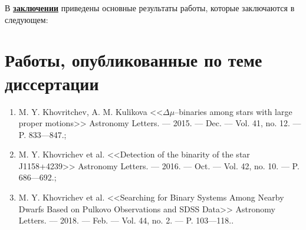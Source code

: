 В \underline{\textbf{заключении}} приведены основные результаты работы, которые заключаются в следующем:




\section*{Работы, опубликованные по теме диссертации}

\begin{enumerate}
 \item M. Y. Khovritchev, A. M. Kulikova <<$\Delta\mu$–binaries among stars with large proper motions>> Astronomy Letters. –– 2015. –– Dec. –– Vol. 41, no. 12. –– P. 833––847.;
 \item M. Y. Khovrichev et al. <<Detection of the binarity of the star J1158+4239>> Astronomy Letters. –– 2016. –– Oct. –– Vol. 42, no. 10. –– P. 686––692.;
 \item M. Y. Khovrichev et al. <<Searching for Binary Systems Among Nearby Dwarfs Based on Pulkovo Observations and SDSS Data>> Astronomy Letters. ––
2018. –– Feb. –– Vol. 44, no. 2. –– P. 103––118..
\end{enumerate}
